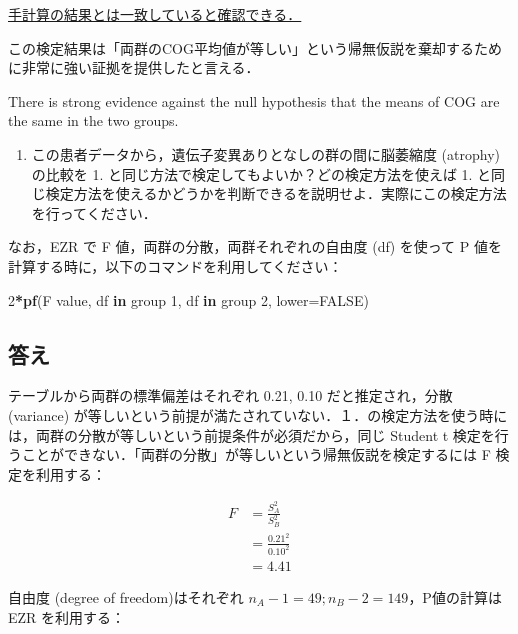 \documentclass[11pt,]{problemset}
\newenvironment{Shaded}{\begin{snugshade}}{\end{snugshade}}
\newcommand{\ControlFlowTok}[1]{\textcolor[rgb]{0.13,0.29,0.53}{\textbf{#1}}}
\newcommand{\DataTypeTok}[1]{\textcolor[rgb]{0.13,0.29,0.53}{#1}}
\newcommand{\DecValTok}[1]{\textcolor[rgb]{0.00,0.00,0.81}{#1}}
\newcommand{\KeywordTok}[1]{\textcolor[rgb]{0.13,0.29,0.53}{\textbf{#1}}}
\newcommand{\NormalTok}[1]{#1}
\newcommand{\OperatorTok}[1]{\textcolor[rgb]{0.81,0.36,0.00}{\textbf{#1}}}
\newcommand{\OtherTok}[1]{\textcolor[rgb]{0.56,0.35,0.01}{#1}}
\providecommand{\tightlist}{%
  \setlength{\itemsep}{0pt}\setlength{\parskip}{0pt}}
\begin{document}
\underline{手計算の結果とは一致していると確認できる．}

この検定結果は「両群のCOG平均値が等しい」という帰無仮説を棄却するために非常に強い証拠を提供したと言える．

There is strong evidence against the null hypothesis that the means of
COG are the same in the two groups.

\newpage
\vfill

\begin{enumerate}
\def\labelenumi{\arabic{enumi}.}
\setcounter{enumi}{1}
\tightlist
\item
  この患者データから，遺伝子変異ありとなしの群の間に脳萎縮度 (atrophy)
  の比較を 1. と同じ方法で検定してもよいか？どの検定方法を使えば 1.
  と同じ検定方法を使えるかどうかを判断できるを説明せよ．実際にこの検定方法を行ってください．
\end{enumerate}

なお，EZR で F 値，両群の分散，両群それぞれの自由度 (df) を使って P
値を計算する時に，以下のコマンドを利用してください：

\begin{Shaded}
\begin{Highlighting}[]
\DecValTok{2}\OperatorTok{*}\KeywordTok{pf}\NormalTok{(F value, df }\ControlFlowTok{in}\NormalTok{ group }\DecValTok{1}\NormalTok{, df }\ControlFlowTok{in}\NormalTok{ group }\DecValTok{2}\NormalTok{, }\DataTypeTok{lower=}\OtherTok{FALSE}\NormalTok{)}
\end{Highlighting}
\end{Shaded}

\hypertarget{-1}{%
\subsection{答え}\label{-1}}

テーブルから両群の標準偏差はそれぞれ 0.21, 0.10 だと推定され，分散
(variance)
が等しいという前提が満たされていない．１．の検定方法を使う時には，両群の分散が等しいという前提条件が必須だから，同じ
Student t
検定を行うことができない．「両群の分散」が等しいという帰無仮説を検定するには
F 検定を利用する：

\[
\begin{aligned}
F & = \frac{S^2_A}{S^2_B} \\
  & = \frac{0.21^2}{0.10^2} \\
  & = 4.41
\end{aligned}
\]

自由度 (degree of freedom)はそれぞれ
\(n_A - 1 = 49; n_B -2 = 149\)，P値の計算は EZR を利用する：
\end{document}
